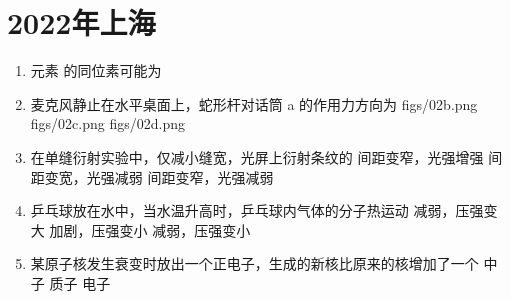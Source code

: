 \documentclass[\gkver]{gaokaozhenti}
\begin{document}
\chapter{2022年上海}

\begin{enumerate}
\item
元素  的同位素可能为
{}
{}
{}

\item
麦克风静止在水平桌面上，蛇形杆对话筒 a 的作用力方向为
{figs/02b.png}
{figs/02c.png}
{figs/02d.png}

\item
在单缝衍射实验中，仅减小缝宽，光屏上衍射条纹的
{间距变窄，光强增强}
{间距变宽，光强减弱}
{间距变窄，光强减弱}

\item
乒乓球放在水中，当水温升高时，乒乓球内气体的分子热运动
{减弱，压强变大}
{加剧，压强变小}
{减弱，压强变小}

\item
某原子核发生衰变时放出一个正电子，生成的新核比原来的核增加了一个
{中子}
{质子}
{电子}


\end{enumerate}
\end{document}
